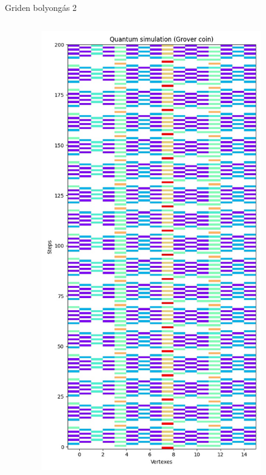 \documentclass[aspectratio=169]{beamer}
\begin{document}
\begin{frame}{Griden bolyongás 2}

  \begin{columns}[onlytextwidth]
    \begin{column}{.25\textwidth}
    \end{column}
    \begin{column}{.25\textwidth}
      \begin{figure}
        \includegraphics[width=0.9\textwidth]{./tdk_figures/results/grid/grover.jpg}

\end{figure}
\end{column}
\end{columns}
\end{frame}
\end{document}
